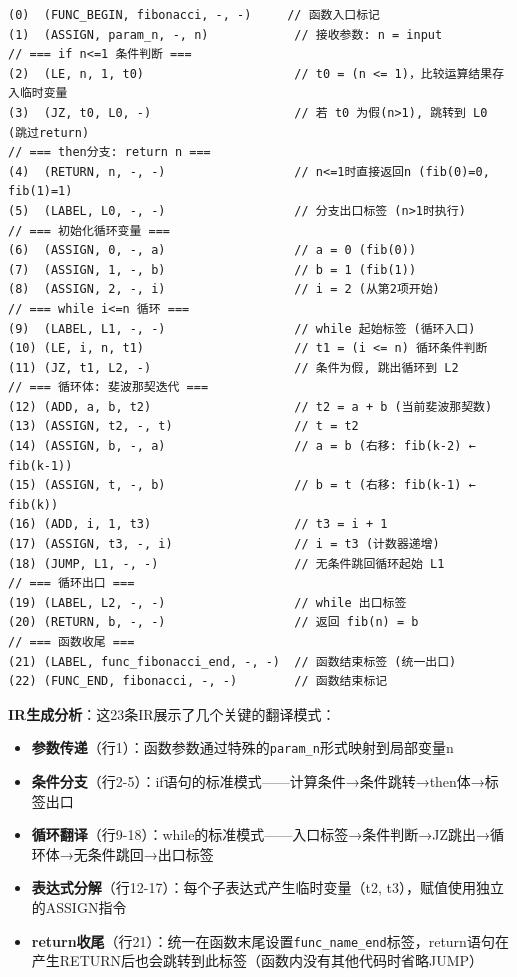 \documentclass[12pt,a4paper]{ctexart}
\begin{document}
\begin{lstlisting}[language=IR, caption={fibonacci函数的四元式IR（含逐行注释）}]
(0)  (FUNC_BEGIN, fibonacci, -, -)     // 函数入口标记
(1)  (ASSIGN, param_n, -, n)            // 接收参数: n = input
// === if n<=1 条件判断 ===
(2)  (LE, n, 1, t0)                     // t0 = (n <= 1)，比较运算结果存入临时变量
(3)  (JZ, t0, L0, -)                    // 若 t0 为假(n>1), 跳转到 L0 (跳过return)
// === then分支: return n ===
(4)  (RETURN, n, -, -)                  // n<=1时直接返回n (fib(0)=0, fib(1)=1)
(5)  (LABEL, L0, -, -)                  // 分支出口标签 (n>1时执行)
// === 初始化循环变量 ===
(6)  (ASSIGN, 0, -, a)                  // a = 0 (fib(0))
(7)  (ASSIGN, 1, -, b)                  // b = 1 (fib(1))
(8)  (ASSIGN, 2, -, i)                  // i = 2 (从第2项开始)
// === while i<=n 循环 ===
(9)  (LABEL, L1, -, -)                  // while 起始标签 (循环入口)
(10) (LE, i, n, t1)                     // t1 = (i <= n) 循环条件判断
(11) (JZ, t1, L2, -)                    // 条件为假, 跳出循环到 L2
// === 循环体: 斐波那契迭代 ===
(12) (ADD, a, b, t2)                    // t2 = a + b (当前斐波那契数)
(13) (ASSIGN, t2, -, t)                 // t = t2
(14) (ASSIGN, b, -, a)                  // a = b (右移: fib(k-2) ← fib(k-1))
(15) (ASSIGN, t, -, b)                  // b = t (右移: fib(k-1) ← fib(k))
(16) (ADD, i, 1, t3)                    // t3 = i + 1
(17) (ASSIGN, t3, -, i)                 // i = t3 (计数器递增)
(18) (JUMP, L1, -, -)                   // 无条件跳回循环起始 L1
// === 循环出口 ===
(19) (LABEL, L2, -, -)                  // while 出口标签
(20) (RETURN, b, -, -)                  // 返回 fib(n) = b
// === 函数收尾 ===
(21) (LABEL, func_fibonacci_end, -, -)  // 函数结束标签 (统一出口)
(22) (FUNC_END, fibonacci, -, -)        // 函数结束标记
\end{lstlisting}

\textbf{IR生成分析}：这23条IR展示了几个关键的翻译模式：
\begin{itemize}
    \item \textbf{参数传递}（行1）：函数参数通过特殊的\texttt{param\_n}形式映射到局部变量n
    \item \textbf{条件分支}（行2-5）：if语句的标准模式——计算条件→条件跳转→then体→标签出口
    \item \textbf{循环翻译}（行9-18）：while的标准模式——入口标签→条件判断→JZ跳出→循环体→无条件跳回→出口标签
    \item \textbf{表达式分解}（行12-17）：每个子表达式产生临时变量（t2, t3），赋值使用独立的ASSIGN指令
    \item \textbf{return收尾}（行21）：统一在函数末尾设置\texttt{func\_name\_end}标签，return语句在产生RETURN后也会跳转到此标签（函数内没有其他代码时省略JUMP）
\end{itemize}
\end{document}
